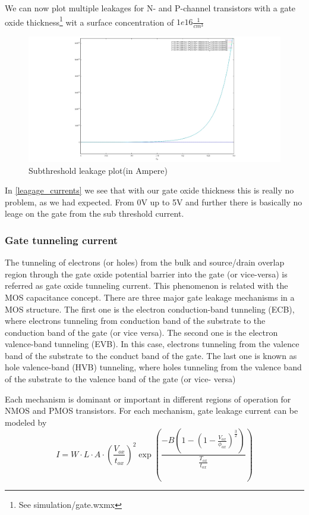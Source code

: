 We can now plot multiple leakages for N- and P-channel transistors with a gate oxide thickness\footnote{See simulation/gate.wxmx} wit a surface concentration of $1e16\frac{1}{cm^3}$
\begin{figure}[H]
	\centering
	\includegraphics[width=\textwidth]{subthreshold_leagage.png}
	\caption{Subthreshold leakage plot(in Ampere)}
	\label{leagage_currents}
\end{figure}
In \autoref{leagage_currents} we see that with our gate oxide thickness this is really no problem, as we had expected.
From 0V up to 5V and further there is basically no leage on the gate from the sub threshold current.

\subsubsection{Gate tunneling current}

The tunneling of electrons (or holes) from the bulk and source/drain overlap region through the gate oxide potential barrier into the gate (or vice-versa) is referred as gate oxide tunneling current.
This phenomenon is related with the MOS capacitance concept.
There are three major gate leakage mechanisms in a MOS structure.
The first one is the electron conduction-band tunneling (ECB), where electrons tunneling from conduction band of the substrate to the conduction band of the gate (or vice versa).
The second one is the electron valence-band tunneling (EVB). In this case, electrons tunneling from the valence band of the substrate to the conduct band of the gate.
The last one is known as hole valence-band (HVB) tunneling, where holes tunneling from the valence band of the substrate to the valence band of the gate (or vice- versa)

Each mechanism is dominant or important in different regions of operation for NMOS and PMOS transistors. For each mechanism, gate leakage current can be modeled by
\begin{equation}
I = W \cdot L \cdot A \cdot \left(\frac{V_{ox}}{t_{ox}}\right)^2\exp\left(\frac{-B\left(1-\left(1-\frac{V_{ox}}{\phi_{ox}}\right)^{\frac{3}{2}}\right)}{\frac{T_{ox}}{t_{ox}}}\right)
\end{equation}
